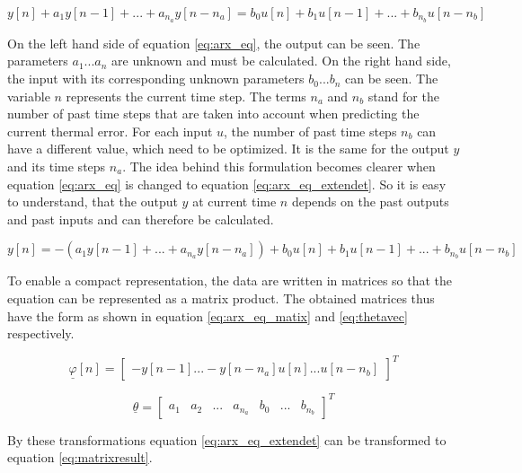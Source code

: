  \begin{equation}
	y[n]+a_1y[n-1]+...+a_{n_a}y[n-n_a] = b_0 u[n]+b_1u[n-1]+...+b_{n_b} u[n-n_b]
	\label{eq:arx_eq}
\end{equation}

On the left hand side of equation \ref{eq:arx_eq}, the output can be seen. The parameters $a_1 ... a_n$ are unknown and must be calculated. On the right hand side, the input with its corresponding unknown parameters $b_0 ... b_n$ can be seen. The variable $n$ represents the current time step. The terms $n_a$ and $n_b$ stand for the number of past time steps that are taken into account when predicting the current thermal error. For each input $u$, the number of past time steps $n_b$ can have a different value, which need to be optimized. It is the same for the output $y$ and its time steps $n_a$. The idea behind this formulation becomes clearer when equation \ref{eq:arx_eq} is changed to equation \ref{eq:arx_eq_extendet}. So it is easy to understand, that the output $y$ at current time $n$ depends on the past outputs and past inputs and can therefore be calculated.

 \begin{equation}
	y[n] = -(a_1y[n-1]+...+a_{n_a}y[n-n_a]) + b_0 u[n]+b_1u[n-1]+...+b_{n_b} u[n-n_b]
	\label{eq:arx_eq_extendet}
\end{equation}

To enable a compact representation, the data are written in matrices so that the equation can be represented as a matrix product. The obtained matrices thus have the form as shown in equation \ref{eq:arx_eq_matix} and \ref{eq:thetavec} respectively.

 \begin{equation}
 	\underline{\varphi}[n] = \begin{bmatrix}
		-y[n-1]...-y[n-n_a]  u[n]...u[n-n_b]
				\end{bmatrix}^T
	\label{eq:arx_eq_matix}
\end{equation}

 \begin{equation}
	\underline{\theta} =  \begin{bmatrix}
		a_1 & a_2 & ... & a_{n_a} & b_0 & ... & b_{n_b}
				\end{bmatrix}^T
	\label{eq:thetavec}
\end{equation}

By these transformations equation \ref{eq:arx_eq_extendet} can be transformed to equation \ref{eq:matrixresult}.


